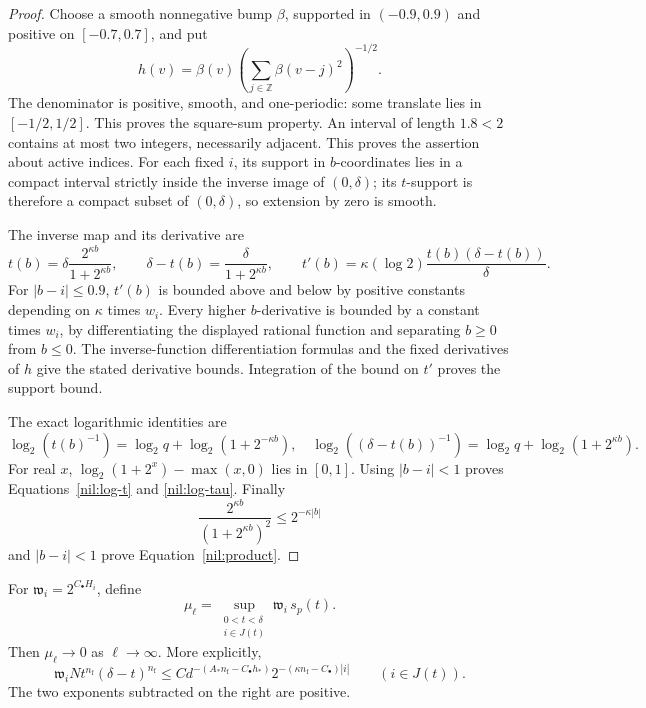 \begin{proof}
Choose a smooth nonnegative bump \(\beta\), supported in
\((-0.9,0.9)\) and positive on \([-0.7,0.7]\), and put
\[
 h(v)=\beta(v)\left(\sum_{j\in\mathbb Z}\beta(v-j)^2\right)^{-1/2}.
\]
The denominator is positive, smooth, and one-periodic:
some translate lies in \([-1/2,1/2]\).
This proves the square-sum property. An interval of length
\(1.8<2\) contains at most two integers, necessarily adjacent.
This proves the assertion about active indices.
For each fixed \(i\), its support in \(b\)-coordinates lies
in a compact interval strictly inside the inverse image
of \((0,\delta)\); its \(t\)-support is therefore a compact
subset of \((0,\delta)\), so extension by zero is smooth.

The inverse map and its derivative are
\[
 t(b)=\delta\frac{2^{\kappa b}}{1+2^{\kappa b}},\qquad
 \delta-t(b)=\frac{\delta}{1+2^{\kappa b}},\qquad
 t'(b)=\kappa(\log2)\frac{t(b)(\delta-t(b))}{\delta}.
\]
For \(|b-i|\le0.9\), \(t'(b)\) is bounded above and below by
positive constants depending on \(\kappa\) times \(w_i\).
Every higher \(b\)-derivative is bounded by a constant times
\(w_i\), by differentiating the displayed rational function
and separating \(b\ge0\) from \(b\le0\).
The inverse-function differentiation formulas and the fixed
derivatives of \(h\) give the stated derivative bounds.
Integration of the bound on \(t'\) proves the support bound.

The exact logarithmic identities are
\[
 \log_2(t(b)^{-1})=\log_2q+\log_2(1+2^{-\kappa b}),\quad
 \log_2((\delta-t(b))^{-1})=\log_2q+\log_2(1+2^{\kappa b}).
\]
For real \(x\), \(\log_2(1+2^x)-\max(x,0)\) lies in \([0,1]\).
Using \(|b-i|<1\) proves Equations~\ref{nil:log-t} and
\ref{nil:log-tau}. Finally
\[
 \frac{2^{\kappa b}}{(1+2^{\kappa b})^2}\le2^{-\kappa|b|}
\]
and \(|b-i|<1\) prove Equation~\ref{nil:product}.
\end{proof}

\begin{proposition}\label{nil:weighted}
For \(\mathfrak w_i=2^{C_\bullet H_i}\), define
\[
 \mu_\ell=\sup_{\substack{0<t<\delta\\i\in J(t)}}
                          \mathfrak w_i\,s_p(t).
\]
Then \(\mu_\ell\to0\) as \(\ell\to\infty\). More explicitly,
\begin{equation}\label{nil:weighted-estimate}
 \mathfrak w_i N t^{n_{\mathrm f}}(\delta-t)^{n_{\mathrm f}}
 \le C d^{-(A_*n_{\mathrm f}-C_\bullet h_*)}
          2^{-(\kappa n_{\mathrm f}-C_\bullet)|i|}
                  \qquad(i\in J(t)).
\end{equation}
The two exponents subtracted on the right are positive.
\end{proposition}


